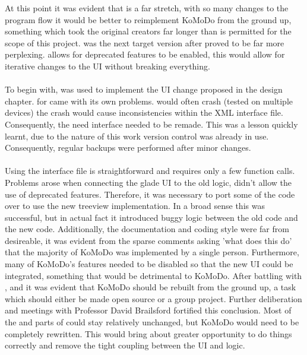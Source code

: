     At this point it was evident that  is a far stretch, with so many changes to the program flow it would be better to reimplement KoMoDo from the ground up, something which took the original creators far longer than is permitted for the scope of this project.
     was the next target version after  proved to be far more perplexing.  allows for deprecated features to be enabled, this would allow for iterative changes to the UI without breaking everything.\\\\
    To begin with,  was used to implement the UI change proposed in the design chapter.  for  came with its own problems.  would often crash (tested on multiple devices) the crash would cause inconsistencies within the XML interface file. Consequently, the need interface needed to be remade. This was a lesson quickly learnt, due to the nature of this work version control was already in use. Consequently, regular backups were performed after minor changes.\\\\
    Using the  interface file is straightforward and requires only a few  function calls. Problems arose when connecting the glade UI to the old logic,  didn't allow the use of deprecated features. Therefore, it was necessary to port some of the code over to use the new treeview implementation. In a broad sense this was successful, but in actual fact it introduced buggy logic between the old  code and the new  code. Additionally, the documentation and coding style were far from desireable, it was evident from the sparse comments asking 'what does this do' that the majority of KoMoDo was implemented by a single person. Furthermore, many of KoMoDo's features needed to be disabled so that the new UI could be integrated, something that would be detrimental to KoMoDo.
    After battling with ,  and  it was evident that KoMoDo should be rebuilt from the ground up, a task which should either be made open source or a group project. Further deliberation and meetings with Professor David Brailsford fortified this conclusion. Most of the  and parts of  could stay relatively unchanged, but KoMoDo would need to be completely rewritten. This would bring about greater opportunity to do things correctly and remove the tight coupling between the UI and logic.\\\\
